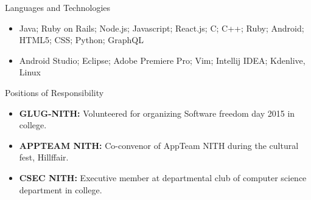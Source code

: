 \documentclass[]{mcdowellcv}
\begin{document}
	\begin{cvsection}{Languages and Technologies}
		\begin{cvsubsection}{}{}{}	
			\begin{itemize}
				\item Java; Ruby on Rails; Node.js; Javascript; React.js; C; C++; Ruby; Android; HTML5; CSS; Python; GraphQL
				\item Android Studio; Eclipse; Adobe Premiere Pro; Vim; Intellij IDEA; Kdenlive, Linux
			\end{itemize}
		\end{cvsubsection}
	\end{cvsection}
	
	\begin{cvsection}{Positions of Responsibility}
		\begin{cvsubsection}{}{}{}	
			\begin{itemize}
				\item \textbf{GLUG-NITH:} Volunteered for organizing Software freedom day 2015 in college.
				\item \textbf{APPTEAM NITH:} Co-convenor of AppTeam NITH during the cultural fest, Hillffair.
				\item \textbf{CSEC NITH:} Executive member at departmental club of computer science department in college.
			\end{itemize}
		\end{cvsubsection}
	\end{cvsection}
	
\end{document}

